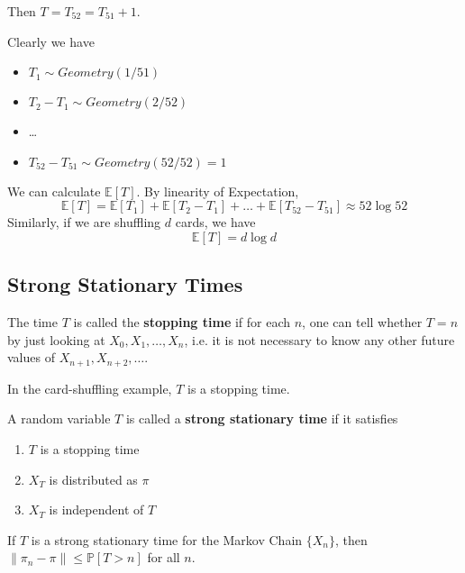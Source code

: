             Then $T = T_{52} = T_{51} + 1$.

            Clearly we have
            \begin{itemize}
                \item $T_1 \sim Geometry(1/51)$
                \item $T_2 - T_1 \sim Geometry(2/52)$
                \item \dots
                \item $T_{52} - T_{51} \sim Geometry(52/52) = 1$
            \end{itemize}

            We can calculate $\mathbb{E}[T]$. By linearity of Expectation,
            \[ \mathbb{E}[T] = \mathbb{E}[T_1] + \mathbb{E}[T_2-T_1] + \dots + \mathbb{E}[T_52 - T_51] \approx 52\log 52 \]
            Similarly, if we are shuffling $d$ cards, we have
            \[ \mathbb{E}[T] = d\log{d} \]

    \subsection{Strong Stationary Times}
        \begin{definition}
            The time $T$ is called the \textbf{stopping time} if for each $n$, one can tell whether $T=n$ by just looking at $X_0, X_1, \dots, X_n$, i.e. it is not necessary to know any other future values of $X_{n+1}, X_{n+2}, \dots$.
        \end{definition}
        \begin{remark}
            In the card-shuffling example, $T$ is a stopping time.
        \end{remark}
        \begin{definition}
            A random variable $T$ is called a \textbf{strong stationary time} if it satisfies
            \begin{enumerate}
                \item $T$ is a stopping time
                \item $X_T$ is distributed as $\pi$
                \item $X_T$ is independent of $T$
            \end{enumerate}
        \end{definition}
        \begin{lemma}\label{Lemma:StrongStationaryTime}
            If $T$ is a strong stationary time for the Markov Chain $\{X_n\}$, then $\|\pi_n - \pi\| \le \mathbb{P}[T > n]$ for all $n$.
        \end{lemma}

